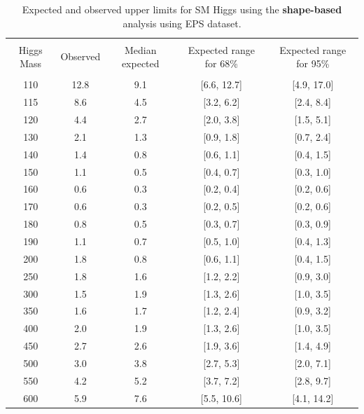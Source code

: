 
\begin{table}[hbp!]
\begin{center}
\begin{tabular}{c c c c c}
\hline
\vspace{-3mm} && \\
 Higgs Mass   & Observed & Median expected & Expected range for 68\% & Expected range for 95\%   \\
\vspace{-3mm} && \\
\hline
110 & 12.8 & 9.1 & [6.6, 12.7] & [4.9, 17.0] \\
115 & 8.6 & 4.5 & [3.2, 6.2] & [2.4, 8.4] \\
120 & 4.4 & 2.7 & [2.0, 3.8] & [1.5, 5.1] \\
130 & 2.1 & 1.3 & [0.9, 1.8] & [0.7, 2.4] \\
140 & 1.4 & 0.8 & [0.6, 1.1] & [0.4, 1.5] \\
150 & 1.1 & 0.5 & [0.4, 0.7] & [0.3, 1.0] \\
160 & 0.6 & 0.3 & [0.2, 0.4] & [0.2, 0.6] \\
170 & 0.6 & 0.3 & [0.2, 0.5] & [0.2, 0.6] \\
180 & 0.8 & 0.5 & [0.3, 0.7] & [0.3, 0.9] \\
190 & 1.1 & 0.7 & [0.5, 1.0] & [0.4, 1.3] \\
200 & 1.8 & 0.8 & [0.6, 1.1] & [0.4, 1.5] \\
250 & 1.8 & 1.6 & [1.2, 2.2] & [0.9, 3.0] \\
300 & 1.5 & 1.9 & [1.3, 2.6] & [1.0, 3.5] \\
350 & 1.6 & 1.7 & [1.2, 2.4] & [0.9, 3.2] \\
400 & 2.0 & 1.9 & [1.3, 2.6] & [1.0, 3.5] \\
450 & 2.7 & 2.6 & [1.9, 3.6] & [1.4, 4.9] \\
500 & 3.0 & 3.8 & [2.7, 5.3] & [2.0, 7.1] \\
550 & 4.2 & 5.2 & [3.7, 7.2] & [2.8, 9.7] \\
600 & 5.9 & 7.6 & [5.5, 10.6] & [4.1, 14.2] \\
\hline
\end{tabular}
\caption{Expected and observed upper limits for SM Higgs using the
  {\bf shape-based} analysis using EPS dataset.}
\label{tab:mvabase_uls_eps}
\end{center}
\end{table}

